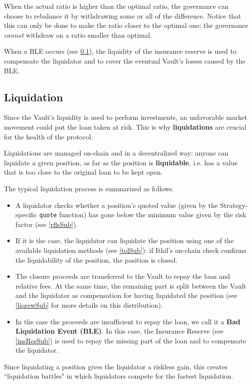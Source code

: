 \documentclass[a4paper,10 pt]{article}
\theoremstyle{definition}
\begin{document}
When the actual ratio is higher than the optimal ratio, the governance can choose to rebalance it by withdrawing some or all of the difference. Notice that this can only be done to make the ratio closer to the optimal one: the governance {\it cannot} withdraw on a ratio smaller than optimal.

When a BLE occurs (see \ref{liqSub0}), the liquidity of the insurance reserve is used to compensate the liquidator and to cover the eventual Vault's losses caused by the BLE.

\subsection{Liquidation}\label{liqSub0}
Since the Vault's liquidity is used to perform investments, an unfavorable market movement could put the loan taken at risk. This is why {\bf liquidations} are crucial for the health of the protocol.

Liquidations are managed on-chain and in a decentralized way: anyone can liquidate a given position, as far as the position is {\bf liquidable}, i.e. has a value that is too close to the original loan to be kept open.

The typical liquidation process is summarized as follows.
\begin{itemize}
\item A liquidator checks whether a position's quoted value (given by the Strategy-specific \verb|quote| function) has gone below the minimum value given by the risk factor (see \ref{rflsSub}).
\item If it is the case, the liquidator can liquidate the position using one of the available liquidation methods (see \ref{tolSub}): if Ithil's on-chain check confirms the liquidability of the position, the position is closed.
\item The closure proceeds are transferred to the Vault to repay the loan and relative fees. At the same time, the remaining part is split between the Vault and the liquidator as compensation for having liquidated the position (see \ref{liqrewSub} for more details on this distribution).
\item In the case the proceeds are insufficient to repay the loan, we call it a {\bf Bad Liquidation Event (BLE)}. In this case, the Insurance Reserve (see \ref{insResSub}) is used to repay the missing part of the loan and to compensate the liquidator.
\end{itemize}

Since liquidating a position gives the liquidator a riskless gain, this creates ``liquidation battles" in which liquidators compete for the fastest liquidation.
\end{document}
